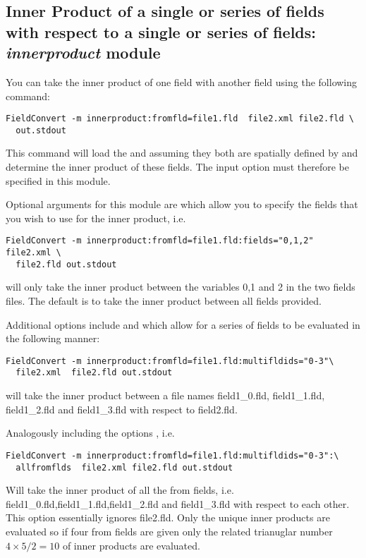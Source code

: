 \subsection{Inner Product of a single or series of fields with respect to a single or series of fields: \textit{innerproduct} module}
You can take the inner product of one field with another field using
the following command:
\begin{lstlisting}[style=BashInputStyle]
  FieldConvert -m innerproduct:fromfld=file1.fld  file2.xml file2.fld \
  out.stdout
\end{lstlisting}
This command will load the  and 
assuming they both are spatially defined by \inltt{files.xml} and
determine the inner product of these fields. The input option
 must therefore be specified in this module.

Optional arguments for this module are  which allow you to specify
the fields that you wish to use for the inner product, i.e.
\begin{lstlisting}[style=BashInputStyle]
  FieldConvert -m innerproduct:fromfld=file1.fld:fields="0,1,2" file2.xml \
  file2.fld out.stdout
\end{lstlisting}
will only take the inner product between the variables 0,1 and 2 in
the two fields files. The default is to take the inner product between
all fields provided.

Additional options include  and 
which allow for a series of fields to be evaluated in the following
manner:
\begin{lstlisting}[style=BashInputStyle]
  FieldConvert -m innerproduct:fromfld=file1.fld:multifldids="0-3"\
  file2.xml  file2.fld out.stdout
\end{lstlisting}
will take the inner product between a file names
field1\_0.fld, field1\_1.fld, field1\_2.fld and field1\_3.fld with
respect to field2.fld.

Analogously including the options \inltt{allfromflds}, i.e.
\begin{lstlisting}[style=BashInputStyle]
  FieldConvert -m innerproduct:fromfld=file1.fld:multifldids="0-3":\
  allfromflds  file2.xml file2.fld out.stdout
\end{lstlisting}
Will take the inner product of all the from fields,
i.e. field1\_0.fld,field1\_1.fld,field1\_2.fld and field1\_3.fld with
respect to each other. This option essentially ignores file2.fld. Only
the unique inner products are evaluated so if four from fields are
given only the related trianuglar number $4\times5/2=10$ of inner
products are evaluated.

